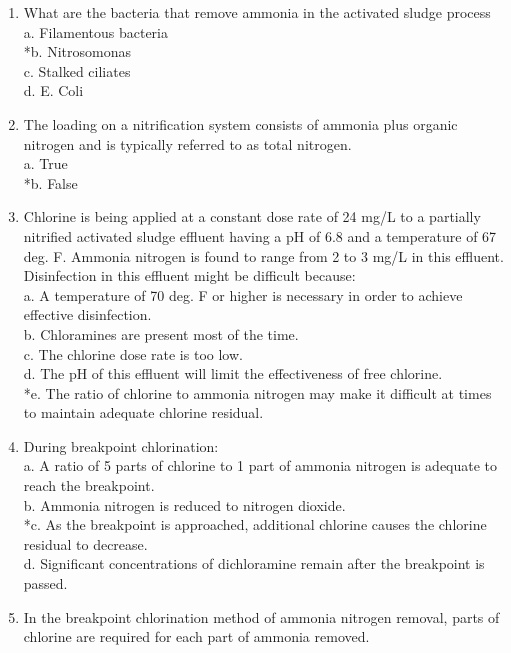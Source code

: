 \begin{enumerate}
\item What are the bacteria that remove ammonia in the activated sludge process \\

a. Filamentous bacteria \\
*b. Nitrosomonas \\
c. Stalked ciliates \\
d. E. Coli 

\item The loading on a nitrification system consists of ammonia plus organic nitrogen and is typically referred to as total nitrogen. \\

a. True \\
*b. False 

\item Chlorine is being applied at a constant dose rate of 24 mg/L to a partially nitrified activated sludge effluent having a pH of 6.8 and a temperature of 67 deg. F. Ammonia nitrogen is found to range from 2 to 3 mg/L in this effluent. Disinfection in this effluent might be difficult because:\\

a. A temperature of 70 deg. F or higher is necessary in order to achieve effective disinfection. \\
b. Chloramines are present most of the time. \\
c. The chlorine dose rate is too low. \\
d. The pH of this effluent will limit the effectiveness of free chlorine. \\
*e. The ratio of chlorine to ammonia nitrogen may make it difficult at times to maintain adequate chlorine residual. 


\item During breakpoint chlorination:\\ 

a. A ratio of 5 parts of chlorine to 1 part of ammonia nitrogen is adequate to reach the breakpoint. \\
b. Ammonia nitrogen is reduced to nitrogen dioxide. \\
*c. As the breakpoint is approached, additional chlorine causes the chlorine residual to decrease. \\
d. Significant concentrations of dichloramine remain after the breakpoint is passed.


\item In the breakpoint chlorination method of ammonia nitrogen removal, parts of chlorine are required for each part of ammonia removed. \\


\end{enumerate}
